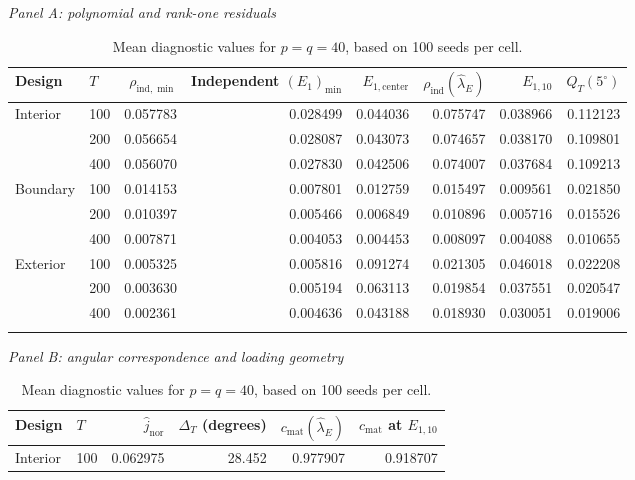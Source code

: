 \begin{table}[p]
\begingroup
{}
\centering\footnotesize
\caption{Mean diagnostic values for $p=q=40$, based on 100 seeds per cell.}
\label{s23:lambda:finite:geometry}
\setlength{\tabcolsep}{3pt}
\renewcommand{\arraystretch}{1.10}
\textit{Panel A: polynomial and rank-one residuals}\par\smallskip
\begin{adjustbox}{max width=\linewidth}
\begin{tabular}{llrrrrrr}
\toprule
Design & $T$ & $\rho_{\mathrm{ind},\min}$ & Independent $(E_1)_{\min}$ & $E_{1,\mathrm{center}}$ & $\rho_{\mathrm{ind}}(\hat\lambda_E)$ & $E_{1,10}$ & $Q_T(5^\circ)$\\
\midrule
Interior & 100 & 0.057783 & 0.028499 & 0.044036 & 0.075747 & 0.038966 & 0.112123\\
 & 200 & 0.056654 & 0.028087 & 0.043073 & 0.074657 & 0.038170 & 0.109801\\
 & 400 & 0.056070 & 0.027830 & 0.042506 & 0.074007 & 0.037684 & 0.109213\\
\addlinespace[2pt]
Boundary & 100 & 0.014153 & 0.007801 & 0.012759 & 0.015497 & 0.009561 & 0.021850\\
 & 200 & 0.010397 & 0.005466 & 0.006849 & 0.010896 & 0.005716 & 0.015526\\
 & 400 & 0.007871 & 0.004053 & 0.004453 & 0.008097 & 0.004088 & 0.010655\\
\addlinespace[2pt]
Exterior & 100 & 0.005325 & 0.005816 & 0.091274 & 0.021305 & 0.046018 & 0.022208\\
 & 200 & 0.003630 & 0.005194 & 0.063113 & 0.019854 & 0.037551 & 0.020547\\
 & 400 & 0.002361 & 0.004636 & 0.043188 & 0.018930 & 0.030051 & 0.019006\\
\addlinespace[2pt]
\bottomrule
\end{tabular}
\end{adjustbox}
\par\medskip
\textit{Panel B: angular correspondence and loading geometry}\par\smallskip
\begin{adjustbox}{max width=\linewidth}
\begin{tabular}{llrrrr}
\toprule
Design & $T$ & $\widehat j_{\mathrm{nor}}$ & $\Delta_T$ (degrees) & $c_{\mathrm{mat}}(\hat\lambda_E)$ & $c_{\mathrm{mat}}$ at $E_{1,10}$\\
\midrule
Interior & 100 & 0.062975 & 28.452 & 0.977907 & 0.918707\\

\end{tabular}
\end{adjustbox}
\end{table}
